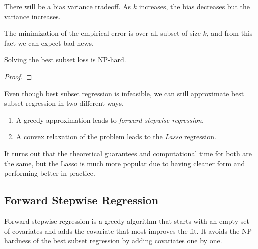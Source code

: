   There will be a bias variance tradeoff. As $k$ increases, the bias decreases but the variance increases. 

  The minimization of the empirical error is over all subset of size $k$, and from this fact we can expect bad news. 

  \begin{theorem}
    Solving the best subset loss is NP-hard. 
  \end{theorem}
  \begin{proof}
    
  \end{proof}

  Even though best subset regression is infeasible, we can still approximate best subset regression in two different ways. 
  \begin{enumerate}
    \item A greedy approximation leads to \textit{forward stepwise regression}. 
    \item A convex relaxation of the problem leads to the \textit{Lasso} regression. 
  \end{enumerate}
  It turns out that the theoretical guarantees and computational time for both are the same, but the Lasso is much more popular due to having cleaner form and performing better in practice. 

\subsection{Forward Stepwise Regression} 

  Forward stepwise regression is a greedy algorithm that starts with an empty set of covariates and adds the covariate that most improves the fit. It avoids the NP-hardness of the best subset regression by adding covariates one by one. 

